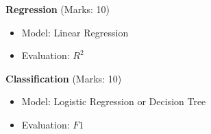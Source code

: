 \begin{homeworkProblem}
\textbf{Regression}
(Marks: 10)
\begin{itemize}
\item Model: Linear Regression
\item Evaluation: $R^2$
\end{itemize}
\end{homeworkProblem}

\begin{homeworkProblem}
\textbf{Classification}
(Marks: 10)
\begin{itemize}
\item Model: Logistic Regression or Decision Tree
\item Evaluation: $F1$
\end{itemize}
\end{homeworkProblem}


